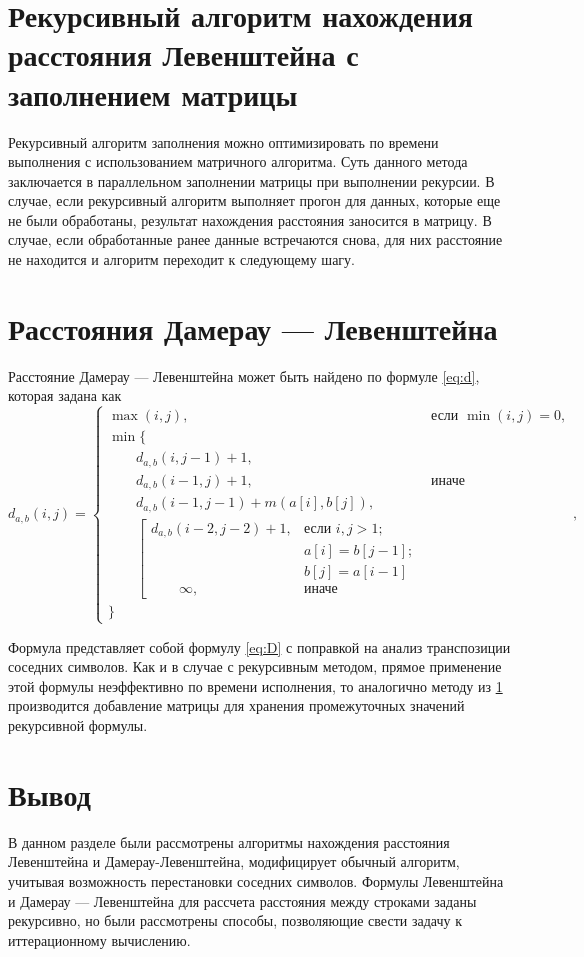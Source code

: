 \section{Рекурсивный алгоритм нахождения расстояния Левенштейна с заполнением матрицы}
\label{sec:recmat}

Рекурсивный алгоритм заполнения можно оптимизировать по времени выполнения с использованием матричного алгоритма. Суть данного метода заключается в параллельном заполнении матрицы при выполнении рекурсии. В случае, если рекурсивный алгоритм выполняет прогон для данных, которые еще не были обработаны, результат нахождения расстояния заносится в матрицу. В случае, если обработанные ранее данные встречаются снова, для них расстояние не находится и алгоритм переходит к следующему шагу.

\section{Расстояния Дамерау — Левенштейна}

Расстояние Дамерау — Левенштейна может быть найдено по формуле \ref{eq:d}, которая задана как
\begin{equation}
	\label{eq:d}
	d_{a,b}(i, j) = \begin{cases}
		\max(i, j), &\text{если }\min(i, j) = 0,\\
		\min \lbrace \\
			\qquad d_{a,b}(i, j-1) + 1,\\
			\qquad d_{a,b}(i-1, j) + 1, &\text{иначе}\\
			\qquad d_{a,b}(i-1, j-1) + m(a[i], b[j]),\\
			\qquad \left[ \begin{array}{cc}d_{a,b}(i-2, j-2) + 1, &\text{если }i,j > 1;\\
			\qquad &\text{}a[i] = b[j-1]; \\
			\qquad &\text{}b[j] = a[i-1]\\
			\qquad \infty, & \text{иначе}\end{array}\right.\\
		\rbrace
		\end{cases},
\end{equation}

Формула представляет собой формулу \ref{eq:D} с поправкой на анализ транспозиции соседних символов.
Как и в случае с рекурсивным методом, прямое применение этой формулы неэффективно по времени исполнения, то аналогично методу из \ref{sec:recmat} производится добавление матрицы для хранения промежуточных значений рекурсивной формулы.

\section{Вывод}
В данном разделе были рассмотрены алгоритмы нахождения расстояния Левенштейна и Дамерау-Левенштейна, модифицирует обычный алгоритм, учитывая возможность перестановки соседних символов. 
Формулы Левенштейна и Дамерау — Левенштейна для рассчета расстояния между строками заданы рекурсивно, но были рассмотрены способы, позволяющие свести задачу к иттерационному вычислению.
